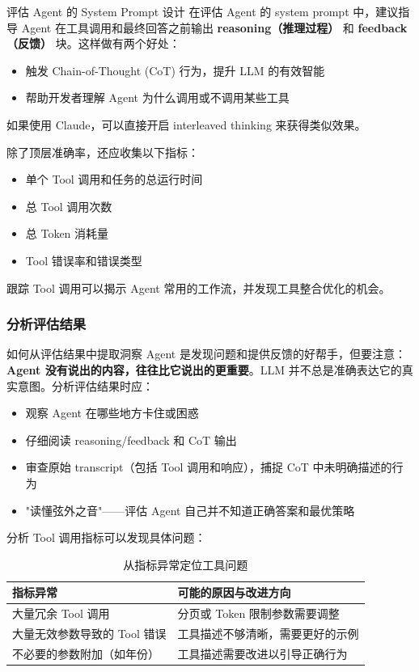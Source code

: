 \documentclass[a4paper]{article}
\begin{document}
\begin{importantbox}{评估 Agent 的 System Prompt 设计}
在评估 Agent 的 system prompt 中，建议指导 Agent 在工具调用和最终回答之前输出 \textbf{reasoning（推理过程）} 和 \textbf{feedback（反馈）} 块。这样做有两个好处：
\begin{itemize}[leftmargin=1.5em]
    \item 触发 Chain-of-Thought (CoT) 行为，提升 LLM 的有效智能
    \item 帮助开发者理解 Agent 为什么调用或不调用某些工具
\end{itemize}
如果使用 Claude，可以直接开启 interleaved thinking 来获得类似效果。
\end{importantbox}

除了顶层准确率，还应收集以下指标：

\begin{itemize}[leftmargin=1.5em]
    \item 单个 Tool 调用和任务的总运行时间
    \item 总 Tool 调用次数
    \item 总 Token 消耗量
    \item Tool 错误率和错误类型
\end{itemize}

跟踪 Tool 调用可以揭示 Agent 常用的工作流，并发现工具整合优化的机会。

\subsubsection{分析评估结果}

\begin{knowledgebox}{如何从评估结果中提取洞察}
Agent 是发现问题和提供反馈的好帮手，但要注意：\textbf{Agent 没有说出的内容，往往比它说出的更重要}。LLM 并不总是准确表达它的真实意图。分析评估结果时应：
\begin{itemize}[leftmargin=1.5em]
    \item 观察 Agent 在哪些地方卡住或困惑
    \item 仔细阅读 reasoning/feedback 和 CoT 输出
    \item 审查原始 transcript（包括 Tool 调用和响应），捕捉 CoT 中未明确描述的行为
    \item "读懂弦外之音"——评估 Agent 自己并不知道正确答案和最优策略
\end{itemize}
\end{knowledgebox}

分析 Tool 调用指标可以发现具体问题：

\begin{table}[H]
\centering
\caption{从指标异常定位工具问题}
\begin{tabular}{p{}p{}}
\toprule
\textbf{指标异常} & \textbf{可能的原因与改进方向} \\
\midrule
大量冗余 Tool 调用 & 分页或 Token 限制参数需要调整 \\
\midrule
大量无效参数导致的 Tool 错误 & 工具描述不够清晰，需要更好的示例 \\
\midrule
不必要的参数附加（如年份） & 工具描述需要改进以引导正确行为 \\
\bottomrule
\end{tabular}
\end{table}
\end{document}
